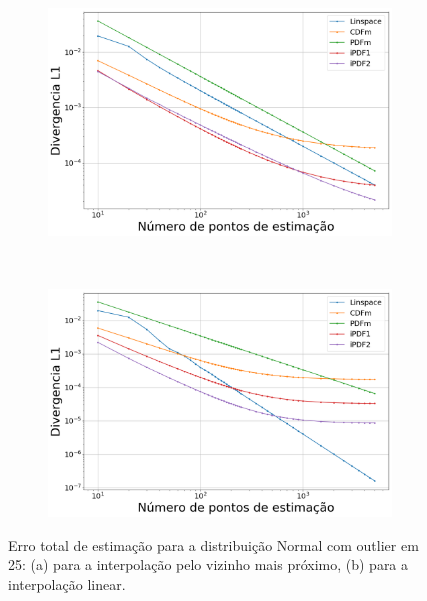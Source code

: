 \begin{figure}[H]
	\centering
	\begin{subfigure}[b]{0.45\textwidth}
		\centering 
		\includegraphics[width=\textwidth]{./figuras/ERRORPLOT_L1_TRUE_NORMAL_NEAREST_025}
		\caption{}
		\label{fig:error_norm_near_50}
	\end{subfigure}
	\hfill
	~ %
	\begin{subfigure}[b]{0.45\textwidth}
		\centering 
		\includegraphics[width=\textwidth]{./figuras/ERRORPLOT_L1_TRUE_NORMAL_LINEAR_025}
		\caption{}
		\label{fig:error_norm_lin_50}
	\end{subfigure}
	\caption{Erro total de estimação para a distribuição Normal com outlier em 25: (a) para a interpolação pelo vizinho mais próximo, (b) para a interpolação linear.}
	\label{fig:Error_out}
\end{figure}


